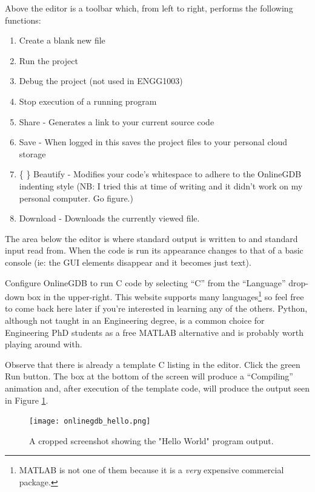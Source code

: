 \documentclass{lab}
\begin{document}
Above the editor is a toolbar which, from left to right, performs the following functions:

\begin{enumerate}
\item Create a blank new file
\item Run the project
\item Debug the project (not used in ENGG1003)
\item Stop execution of a running program
\item Share - Generates a link to your current source code
\item Save - When logged in this saves the project files to your personal cloud storage
\item \{ \} Beautify - Modifies your code's whitespace to adhere to the OnlineGDB indenting style (NB: I tried this at time of writing and it didn't work on my personal computer. Go figure.)
\item Download - Downloads the currently viewed file.
\end{enumerate}

The area below the editor is where standard output is written to and standard input read from. When the code is run its appearance changes to that of a basic console (ie: the GUI elements disappear and it becomes just text).

\begin{task}{}{}
Configure OnlineGDB to run C code by selecting ``C'' from the ``Language'' drop-down box in the upper-right. This website supports many languages\footnote{MATLAB is not one of them because it is a \textit{very} expensive commercial package.} so feel free to come back here later if you're interested in learning any of the others. Python, although not taught in an Engineering degree, is a common choice for Engineering PhD students as a free MATLAB alternative and is probably worth playing around with.
\end{task}

\begin{task}{}{}
Observe that there is already a template C listing in the editor. Click the green Run button. The box at the bottom of the screen will produce a ``Compiling'' animation and, after execution of the template code, will produce the output seen in Figure \ref{fig:onlinegdb_hello}.
\end{task}

\begin{figure}[H]
\begin{center}
\texttt{[image: onlinegdb\_hello.png]}
\end{center}
\caption{A cropped screenshot showing the "Hello World" program output.}\label{fig:onlinegdb_hello}
\end{figure}
\end{document}
